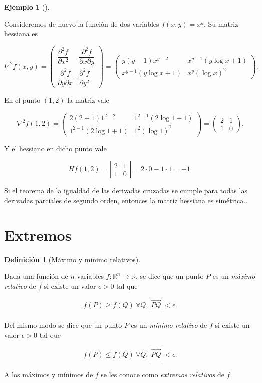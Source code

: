 \documentclass[
  a4paper,
]{scrreport}
\theoremstyle{definition}
\theoremstyle{definition}
\newtheorem{example}{Ejemplo}[chapter]
\theoremstyle{definition}
\newtheorem{definition}{Definición}[chapter]
\theoremstyle{plain}
\theoremstyle{plain}
\theoremstyle{plain}
\theoremstyle{remark}
\begin{document}
\begin{example}[]\protect\hypertarget{exm-matriz-hessiana}{}\label{exm-matriz-hessiana}

Consideremos de nuevo la función de dos variables \(f(x,y)=x^y\). Su
matriz hessiana es

\[\nabla^2f(x,y)=\left(
\begin{array}{cc}
\dfrac{\partial^2 f}{\partial x^2} & \dfrac{\partial^2 f}{\partial x \partial y}\\
\dfrac{\partial^2 f}{\partial y \partial x} & \dfrac{\partial^2 f}{\partial y^2}
\end{array}
\right)
=
\left(
\begin{array}{cc}
y(y-1)x^{y-2} & x^{y-1}(y\log x+1) \\
x^{y-1}(y\log x+1) & x^y(\log x)^2
\end{array}
\right).\]

En el punto \((1,2)\) la matriz vale

\[\nabla^2f(1,2)=\left(
\begin{array}{cc}
2(2-1)1^{2-2} & 1^{2-1}(2\log 1+1) \\
1^{2-1}(2\log 1+1) & 1^2(\log 1)^2
\end{array}
\right)
=
\left(
\begin{array}{cc}
2 & 1 \\
1 & 0
\end{array}
\right).\]

Y el hessiano en dicho punto vale

\[Hf(1,2)=\left|
\begin{array}{cc}
2 & 1 \\
1 & 0
\end{array}
\right|=
2\cdot 0-1\cdot1= -1.
\]

\end{example}

Si el teorema de la igualdad de las derivadas cruzadas se cumple para
todas las derivadas parciales de segundo orden, entonces la matriz
hessiana es simétrica..

\section{Extremos}\label{extremos}

\begin{definition}[Máximo y mínimo
relativos]\protect\hypertarget{def-extremos-relativos}{}\label{def-extremos-relativos}

Dada una función de \(n\) variables \(f:\mathbb{R}^n\to \mathbb{R}\), se
dice que un punto \(P\) es un \emph{máximo relativo} de \(f\) si existe
un valor \(\epsilon>0\) tal que

\[
f(P)\geq f(Q)\ \forall Q, |\vec{PQ}|<\epsilon.
\]

Del mismo modo se dice que un punto \(P\) es un \emph{mínimo relativo}
de \(f\) si existe un valor \(\epsilon>0\) tal que

\[
f(P)\leq f(Q)\ \forall Q, |\vec{PQ}|<\epsilon.
\]

A los máximos y mínimos de \(f\) se les conoce como \emph{extremos
relativos} de \(f\).

\end{definition}
\end{document}
